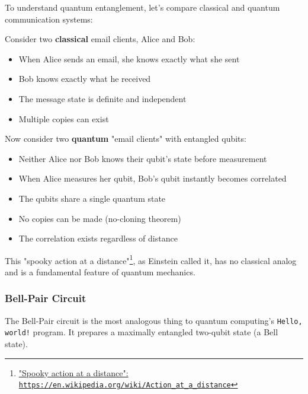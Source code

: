 To understand quantum entanglement, let's compare classical and quantum
communication systems:

\vspace{0.3cm}

\noindent
Consider two \textbf{classical} email clients, Alice and
Bob:

\begin{itemize}
  \item When Alice sends an email, she knows exactly what she sent
  \item Bob knows exactly what he received
  \item The message state is definite and independent
  \item Multiple copies can exist
\end{itemize}

\vspace{0.3cm}

\noindent
Now consider two \textbf{quantum} "email clients" with entangled qubits:

\begin{itemize}
  \item Neither Alice nor Bob knows their qubit's state before measurement
  \item When Alice measures her qubit, Bob's qubit instantly becomes correlated
  \item The qubits share a single quantum state
  \item No copies can be made (no-cloning theorem)
  \item The correlation exists regardless of distance
\end{itemize}

\vspace{0.3cm}

This "spooky action at a distance"\footnote{\href{https://en.wikipedia.org/wiki/Action\_at\_a\_distance\#\%22Spooky\_action\_at\_a\_distance\%22}{"Spooky action at a distance": \texttt{https://en.wikipedia.org/wiki/Action\_at\_a\_distance}}},
as Einstein called it, has no classical analog and is a fundamental feature
of quantum mechanics.

\subsubsection*{Bell-Pair Circuit}

The Bell-Pair circuit is the most analogous thing to quantum computing's
\texttt{Hello, world!} program. It prepares a maximally entangled two-qubit
state (a Bell state).


